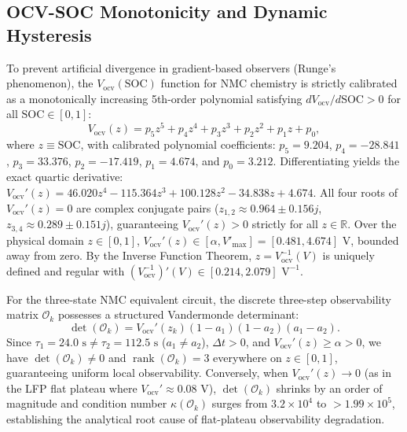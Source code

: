 \documentclass[preprint,12pt]{elsarticle}
\begin{document}
\subsection{OCV-SOC Monotonicity and Dynamic Hysteresis}
To prevent artificial divergence in gradient-based observers (Runge's phenomenon), the $V_{\text{ocv}}(\text{SOC})$ function for NMC chemistry is strictly calibrated as a monotonically increasing 5th-order polynomial satisfying $d V_{\text{ocv}} / d\text{SOC} > 0$ for all $\text{SOC} \in [0, 1]$:
\begin{equation}\label{eqn:ocv_poly}
V_{\text{ocv}}(z) = p_5 z^5 + p_4 z^4 + p_3 z^3 + p_2 z^2 + p_1 z + p_0,
\end{equation}
where $z \equiv \text{SOC}$, with calibrated polynomial coefficients: $p_5 = 9.204$, $p_4 = -28.841$, $p_3 = 33.376$, $p_2 = -17.419$, $p_1 = 4.674$, and $p_0 = 3.212$. Differentiating yields the exact quartic derivative:
$V_{\text{ocv}}'(z) = 46.020 z^4 - 115.364 z^3 + 100.128 z^2 - 34.838 z + 4.674$. All four roots of $V_{\text{ocv}}'(z) = 0$ are complex conjugate pairs ($z_{1,2} \approx 0.964 \pm 0.156 j$, $z_{3,4} \approx 0.289 \pm 0.151 j$), guaranteeing $V_{\text{ocv}}'(z) > 0$ strictly for all $z \in \mathbb{R}$. Over the physical domain $z \in [0, 1]$, $V_{\text{ocv}}'(z) \in [\alpha, V'_{\max}] = [0.481, 4.674]\text{ V}$, bounded away from zero. By the Inverse Function Theorem, $z = V_{\text{ocv}}^{-1}(V)$ is uniquely defined and regular with $(V_{\text{ocv}}^{-1})'(V) \in [0.214, 2.079]\text{ V}^{-1}$.

For the three-state NMC equivalent circuit, the discrete three-step observability matrix $\mathcal{O}_k$ possesses a structured Vandermonde determinant:
\begin{equation}\label{eqn:det_obs}
\det(\mathcal{O}_k) = V_{\text{ocv}}'(z_k) (1 - a_1)(1 - a_2)(a_1 - a_2).
\end{equation}
Since $\tau_1 = 24.0\text{ s} \ne \tau_2 = 112.5\text{ s}$ ($a_1 \ne a_2$), $\Delta t > 0$, and $V_{\text{ocv}}'(z) \ge \alpha > 0$, we have $\det(\mathcal{O}_k) \ne 0$ and $\operatorname{rank}(\mathcal{O}_k) = 3$ everywhere on $z \in [0, 1]$, guaranteeing uniform local observability. Conversely, when $V_{\text{ocv}}'(z) \to 0$ (as in the LFP flat plateau where $V_{\text{ocv}}' \approx 0.08\text{ V}$), $\det(\mathcal{O}_k)$ shrinks by an order of magnitude and condition number $\kappa(\mathcal{O}_k)$ surges from $3.2 \times 10^4$ to $> 1.99 \times 10^5$, establishing the analytical root cause of flat-plateau observability degradation.
\end{document}
